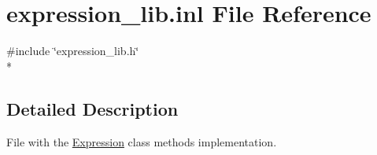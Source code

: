 \hypertarget{expression__lib_8inl}{}\section{expression\+\_\+lib.\+inl File Reference}
\label{expression__lib_8inl}
{\ttfamily \#include \char`\"{}expression\+\_\+lib.\+h\char`\"{}}\\*


\subsection{Detailed Description}
File with the \hyperlink{class_expression}{Expression} class methods implementation. 